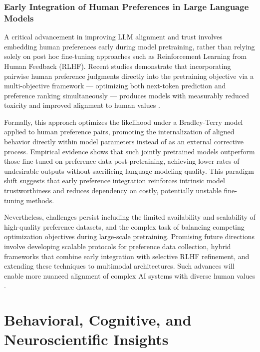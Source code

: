 \subsubsection{Early Integration of Human Preferences in Large Language Models}

A critical advancement in improving LLM alignment and trust involves embedding human preferences early during model pretraining, rather than relying solely on post hoc fine-tuning approaches such as Reinforcement Learning from Human Feedback (RLHF). Recent studies demonstrate that incorporating pairwise human preference judgments directly into the pretraining objective via a multi-objective framework — optimizing both next-token prediction and preference ranking simultaneously — produces models with measurably reduced toxicity and improved alignment to human values \cite{ref41}.

Formally, this approach optimizes the likelihood under a Bradley-Terry model applied to human preference pairs, promoting the internalization of aligned behavior directly within model parameters instead of as an external corrective process. Empirical evidence shows that such jointly pretrained models outperform those fine-tuned on preference data post-pretraining, achieving lower rates of undesirable outputs without sacrificing language modeling quality. This paradigm shift suggests that early preference integration reinforces intrinsic model trustworthiness and reduces dependency on costly, potentially unstable fine-tuning methods.

Nevertheless, challenges persist including the limited availability and scalability of high-quality preference datasets, and the complex task of balancing competing optimization objectives during large-scale pretraining. Promising future directions involve developing scalable protocols for preference data collection, hybrid frameworks that combine early integration with selective RLHF refinement, and extending these techniques to multimodal architectures. Such advances will enable more nuanced alignment of complex AI systems with diverse human values \cite{ref41}.

\section{Behavioral, Cognitive, and Neuroscientific Insights}

